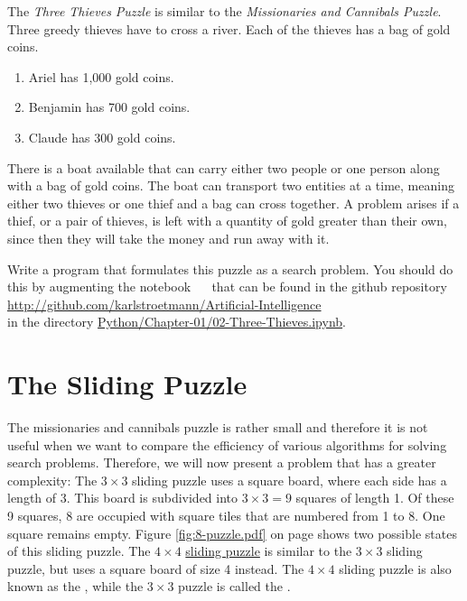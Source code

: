 \exercise
The \emph{Three Thieves Puzzle} is similar to the \emph{Missionaries and Cannibals Puzzle}.  Three greedy
thieves have to cross a river.  Each of the thieves has a bag of gold coins.
\begin{enumerate}
\item Ariel has 1,000 gold coins.
\item Benjamin has 700 gold coins.
\item Claude has 300 gold coins.
\end{enumerate}
There is a boat available that can carry either two people or one person along with a bag of gold coins. The
boat can transport two entities at a time, meaning either two thieves or one thief and a bag can cross
together. A problem arises if a thief, or a pair of thieves, is left with a quantity of gold greater than
their own, since then they will take the money and run away with it. 

Write a program that formulates this puzzle as a search problem.  You should do this by augmenting the notebook
\  \ that can be found in the github repository
\\[0.2cm]
\hspace*{1.3cm}
\href{https://github.com/karlstroetmann/Artificial-Intelligence}{http://github.com/karlstroetmann/Artificial-Intelligence}
\\[0.2cm]
in the directory
\href{https://github.com/karlstroetmann/Artificial-Intelligence/blob/master/Python/Chapter-01/02-Three-Thieves.ipynb}{Python/Chapter-01/02-Three-Thieves.ipynb}. 
\eox


\section{The Sliding Puzzle}
The missionaries and cannibals puzzle is rather small and therefore it is not useful when we want to compare
the efficiency of various algorithms for solving search problems.  Therefore, we will now present a problem
that has a greater complexity:  The $3 \times 3$ sliding puzzle uses a 
square board, where each side has a length of 3.  This board is subdivided into $3 \times 3 = 9$ squares of length 1.  Of
these 9 squares, 8 are occupied with square tiles that are numbered from 1 to 8.  One square remains
empty. Figure \ref{fig:8-puzzle.pdf} on page \pageref{fig:8-puzzle.pdf} shows two possible states of this
sliding puzzle.  The $4 \times 4$ \href{https://en.wikipedia.org/wiki/15_puzzle}{sliding puzzle}
is similar to the $3 \times 3$ sliding puzzle, but uses a square board of size 4
instead.  The $4 \times 4$ sliding puzzle is also known as the , while the $3 \times 3$ puzzle is
called the .  

